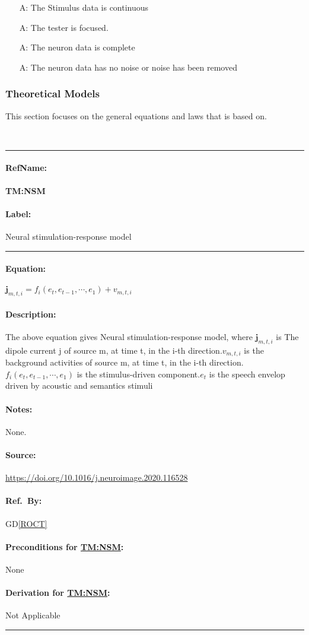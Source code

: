 \documentclass[12pt]{article}
\newcommand{\dref}[1]{GD\ref{#1}}
\newcounter{assumpnum} %
\newcommand{\deftheory}[9][Not Applicable]
{
\newpage
\noindent \rule{\textwidth}{0.5mm}

\paragraph{RefName: } \textbf{#2} \phantomsection
\label{#2}

\paragraph{Label:} #3

\noindent \rule{\textwidth}{0.5mm}

\paragraph{Equation:}

#4

\paragraph{Description:}

#5

\paragraph{Notes:}

#6

\paragraph{Source:}

#7

\paragraph{Ref.\ By:}

#8

\paragraph{Preconditions for \hyperref[#2]{#2}:}
\label{#2_precond}

#9

\paragraph{Derivation for \hyperref[#2]{#2}:}
\label{#2_deriv}

#1

\noindent \rule{\textwidth}{0.5mm}

}
\begin{document}
\begin{itemize}

  \item[A\refstepcounter{assumpnum}\theassumpnum:] The Stimulus data is continuous
  \item[A\refstepcounter{assumpnum}\theassumpnum:] The tester is focused.
  \item[A\refstepcounter{assumpnum}\theassumpnum:] The neuron data is complete
  \item[A\refstepcounter{assumpnum}\theassumpnum:] The neuron data has no noise or noise has been removed

\end{itemize}

\subsubsection{Theoretical Models}\label{sec_theoretical}

%

This section focuses on the general equations and laws that \progname{} is based
on.

~\newline

\noindent
\deftheory
{TM:NSM}
{Neural stimulation-response model}
{

$\boldsymbol{j}_{m, t, i}=f_{i}\left(e_{t}, e_{t-1}, \cdots, e_{1}\right)+v_{m, t, i}$

}
{
  The above equation gives Neural stimulation-response model, where ${\boldsymbol{j}_{m, t, i}}$
is The dipole current j of source m, at time t, in the i-th direction.${v_{m, t, i}} $ is the background
activities of source m, at time t, in the i-th direction.${f_{i}\left(e_{t}, e_{t-1}, \cdots, e_{1}\right)}$
is the stimulus-driven component.$e_{t}$ is the speech envelop driven by acoustic and semantics stimuli

}
{
None.
}
{
  \url{https://doi.org/10.1016/j.neuroimage.2020.116528}
}
{
  \dref{ROCT}
}
{
None
}
{}
\end{document}
